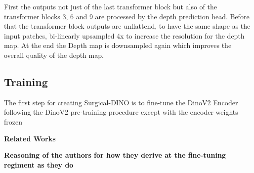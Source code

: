 
First the outputs not just of the last transformer block but also of the transformer blocks 3, 6 and 9 are processed by the depth prediction head.
Before that the transformer block outputs are unflattend, to have the same shape as the input patches, bi-linearly upsampled 4x to increase the resolution for the depth map. At the end the Depth map is downsampled again which improves the overall quality of the depth map.


\subsection*{Training}

The first step for creating Surgical-DINO is to fine-tune the DinoV2 Encoder following the DinoV2 pre-training procedure except with the encoder weights frozen

\textbf{Related Works}

\textbf{Reasoning of the authors for how they derive at the fine-tuning regiment as they do}

